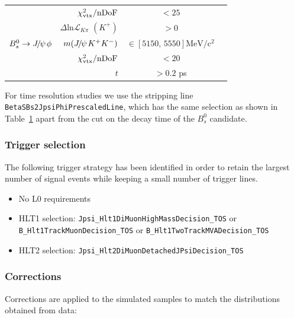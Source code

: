 \begin{table}[h]
\begin{tabular}{lrcc}
                                       & $\chi^2_{\rm vtx}/{\rm nDoF}$                                 & $ < 25$                    \\
                                       & $\Delta \mathrm{ln} \mathcal{L}_{{K}{\pi}}$ $(K^+)$           & $>0$                          \\
      \hline
      $B^0_s \to {\ensuremath{{{J\mskip -3mu/\mskip -2mu\psi\mskip 2mu}}}} \phi$           & $m({{J\mskip -3mu/\mskip -2mu\psi\mskip 2mu}}K^+K^-)$                                           & $\in [5150,\,5550]\mathrm{MeV/c^2}$  \\
                                       & $\chi^2_{\rm vtx}/{\rm nDoF}$                                 &  $< 20$  \\
                                       & $t$                                                          & $>0.2$ ps               \\
      \hline
    \end{tabular}
\label{tab:Bs2Jpsiphistripping}
\end{table}
\renewcommand{\arraystretch}{1.0}

For time resolution studies we use the stripping line {\tt BetaSBs2JpsiPhiPrescaledLine}, which has the same selection as shown in Table~\ref{tab:Bs2Jpsiphistripping} apart from the cut on the decay time of the $B^0_s$ candidate.

\subsubsection{Trigger selection}
\label{sec:trigger}

The following trigger strategy has been identified in order to retain the largest number of signal events while keeping a small number of trigger lines.
\begin{itemize}
\item No L0 requirements
\item HLT1 selection: {\tt Jpsi\_Hlt1DiMuonHighMassDecision\_TOS} or {\tt B\_Hlt1TrackMuonDecision\_TOS} or {\tt B\_Hlt1TwoTrackMVADecision\_TOS}
\item HLT2 selection: {\tt Jpsi\_Hlt2DiMuonDetachedJPsiDecision\_TOS}
\end{itemize}

\subsubsection{Corrections}
Corrections are applied to the simulated samples to match the distributions obtained from data:


